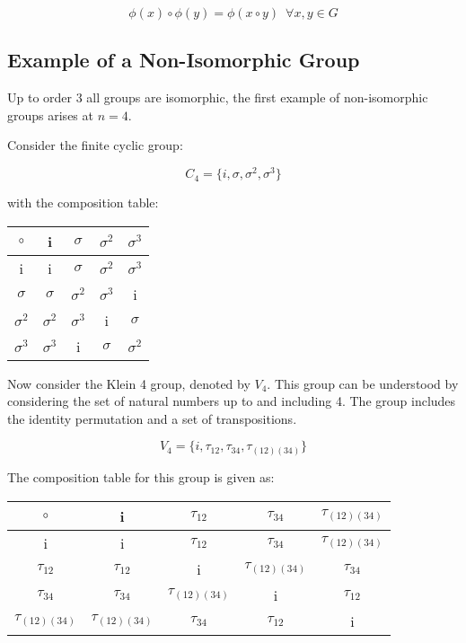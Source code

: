 \documentclass{article}
\begin{document}
\[ \phi(x) \circ \phi(y) = \phi(x \circ y ) \enspace \forall x,y \in G\]

\subsection{Example of a Non-Isomorphic Group}

Up to order 3 all groups are isomorphic, the first example of non-isomorphic groups arises at $n=4$.

Consider the finite cyclic group:

\[ C_{4} = \{ i, \sigma, \sigma^{2}, \sigma^{3} \} \]

with the composition table:

\begin{center}
\begin{tabular}{ |c|c c c c| } 
 \hline
 $\circ$ & i & $\sigma$ & $\sigma^{2}$ & $\sigma^{3}$ \\
 \hline
 i & i & $\sigma$ & $\sigma^{2}$ & $\sigma^{3}$ \\
 $\sigma$ & $\sigma$ & $\sigma^{2}$ & $\sigma^{3}$ & i \\
 $\sigma^{2}$ & $\sigma^{2}$ & $\sigma^{3}$ & i & $\sigma$ \\
 $\sigma^{3}$ & $\sigma^{3}$ & i & $\sigma$ & $\sigma^{2}$ \\
 \hline
\end{tabular}
\end{center}

Now consider the Klein 4 group, denoted by $V_{4}$. This group can be understood by considering the set of natural numbers up to and including 4. The group includes the identity permutation and a set of transpositions.

\[ V_{4} = \{ i, \tau_{12}, \tau_{34}, \tau_{(12)(34)}\}\]

The composition table for this group is given as:

\begin{center}
\begin{tabular}{ |c|c c c c| } 
 \hline
 $\circ$ & i & $\tau_{12}$ & $\tau_{34}$ & $\tau_{(12)(34)}$ \\
 \hline
 i & i & $\tau_{12}$ & $\tau_{34}$ & $\tau_{(12)(34)}$ \\
 $\tau_{12}$ & $\tau_{12}$ & i & $\tau_{(12)(34)}$ & $\tau_{34}$ \\
 $\tau_{34}$ & $\tau_{34}$ & $\tau_{(12)(34)}$ & i & $\tau_{12}$ \\
 $\tau_{(12)(34)}$ & $\tau_{(12)(34)}$ & $\tau_{34}$ & $\tau_{12}$ & i \\
 \hline
\end{tabular}
\end{center}
\end{document}
